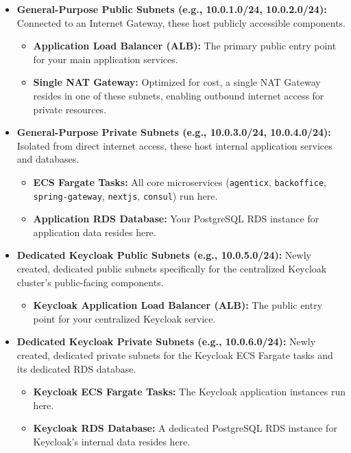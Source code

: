 \documentclass[a4paper,12pt]{article}
\begin{document}
\begin{itemize}
    \item \textbf{General-Purpose Public Subnets (e.g., 10.0.1.0/24, 10.0.2.0/24):} Connected to an Internet Gateway, these host publicly accessible components.
    \begin{itemize}
        \item \textbf{Application Load Balancer (ALB):} The primary public entry point for your main application services.
        \item \textbf{Single NAT Gateway:} Optimized for cost, a single NAT Gateway resides in one of these subnets, enabling outbound internet access for private resources.
    \end{itemize}
    \item \textbf{General-Purpose Private Subnets (e.g., 10.0.3.0/24, 10.0.4.0/24):} Isolated from direct internet access, these host internal application services and databases.
    \begin{itemize}
        \item \textbf{ECS Fargate Tasks:} All core microservices (\texttt{agenticx}, \texttt{backoffice}, \texttt{spring-gateway}, \texttt{nextjs}, \texttt{consul}) run here.
        \item \textbf{Application RDS Database:} Your PostgreSQL RDS instance for application data resides here.
    \end{itemize}
    \item \textbf{Dedicated Keycloak Public Subnets (e.g., 10.0.5.0/24):} Newly created, dedicated public subnets specifically for the centralized Keycloak cluster's public-facing components.
    \begin{itemize}
        \item \textbf{Keycloak Application Load Balancer (ALB):} The public entry point for your centralized Keycloak service.
    \end{itemize}
    \item \textbf{Dedicated Keycloak Private Subnets (e.g., 10.0.6.0/24):} Newly created, dedicated private subnets for the Keycloak ECS Fargate tasks and its dedicated RDS database.
    \begin{itemize}
        \item \textbf{Keycloak ECS Fargate Tasks:} The Keycloak application instances run here.
        \item \textbf{Keycloak RDS Database:} A dedicated PostgreSQL RDS instance for Keycloak's internal data resides here.
    \end{itemize}
\end{itemize}
\end{document}
